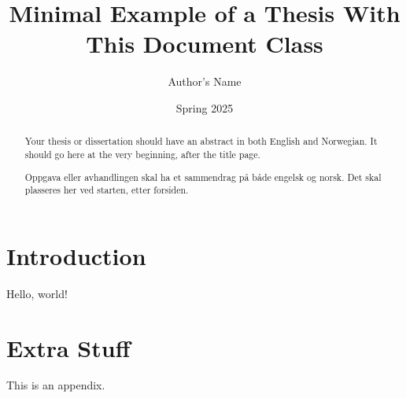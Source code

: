 \documentclass[master]{thesis}
\title{Minimal Example of a Thesis With This Document Class}
\author{Author's Name}
\date{Spring 2025}
\begin{document}
\maketitle

\frontmatter

\begin{abstract}

Your thesis or dissertation should have an abstract in both English and Norwegian. It should go here at the very beginning, after the title page.

\end{abstract}

\begin{otherlanguage}{norsk}
\begin{abstract}

Oppgava eller avhandlingen skal ha et sammendrag på både engelsk og norsk. Det skal plasseres her ved starten, etter forsiden.

\end{abstract}
\end{otherlanguage}

\tableofcontents

\mainmatter

\chapter{Introduction}

Hello, world!

\appendix

\chapter{Extra Stuff}

This is an appendix.
\end{document}
